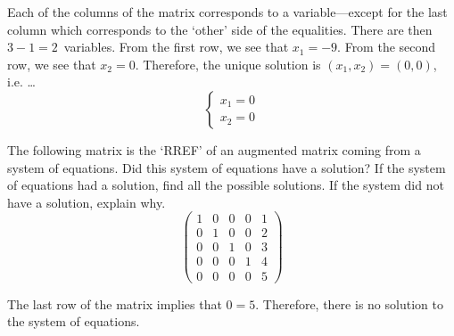 \documentclass[11pt,letterpaper]{article}
\begin{document}
\sol Each of the columns of the matrix corresponds to a variable---except for the last column which corresponds to the `other' side of the equalities. There are then $3 - 1= 2$~variables. From the first row, we see that $x_1= -9$. From the second row, we see that $x_2= 0$. Therefore, the unique solution is $(x_1, x_2)= (0, 0)$, i.e. \dots
	\[
	\begin{cases}
	x_1= 0 \\
	x_2= 0
	\end{cases}
	\]



\newpage



 The following matrix is the `RREF' of an augmented matrix coming from a system of equations. Did this system of equations have a solution? If the system of equations had a solution, find all the possible solutions. If the system did not have a solution, explain why. 
	\[
	\begin{pmatrix}
	1 & 0 & 0 & 0 & 1 \\
	0 & 1 & 0 & 0 & 2 \\
	0 & 0 & 1 & 0 & 3 \\
	0 & 0 & 0 & 1 & 4 \\
	0 & 0 & 0 & 0 & 5 
	\end{pmatrix}
	\] \pspace

\sol The last row of the matrix implies that $0= 5$. Therefore, there is no solution to the system of equations. 
\end{document}
